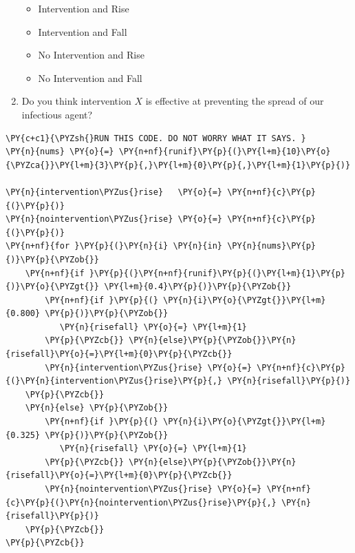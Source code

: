 \begin{enumerate}
  \begin{itemize}
  \tightlist
  \item
    Intervention and Rise
  \item
    Intervention and Fall
  \item
    No Intervention and Rise\\
  \item
    No Intervention and Fall
  \end{itemize}
\item
  Do you think intervention \(X\) is effective at preventing the spread
  of our infectious agent?
\end{enumerate}

    \begin{tcolorbox}[breakable, size=fbox, boxrule=1pt, pad at break*=1mm,colback=cellbackground, colframe=cellborder]
\begin{Verbatim}[commandchars=\\\{\}]
\PY{c+c1}{\PYZsh{}RUN THIS CODE. DO NOT WORRY WHAT IT SAYS. }
\PY{n}{nums} \PY{o}{=} \PY{n+nf}{runif}\PY{p}{(}\PY{l+m}{10}\PY{o}{\PYZca{}}\PY{l+m}{3}\PY{p}{,}\PY{l+m}{0}\PY{p}{,}\PY{l+m}{1}\PY{p}{)}

\PY{n}{intervention\PYZus{}rise}   \PY{o}{=} \PY{n+nf}{c}\PY{p}{(}\PY{p}{)}
\PY{n}{nointervention\PYZus{}rise} \PY{o}{=} \PY{n+nf}{c}\PY{p}{(}\PY{p}{)}
\PY{n+nf}{for }\PY{p}{(}\PY{n}{i} \PY{n}{in} \PY{n}{nums}\PY{p}{)}\PY{p}{\PYZob{}}
    \PY{n+nf}{if }\PY{p}{(}\PY{n+nf}{runif}\PY{p}{(}\PY{l+m}{1}\PY{p}{)}\PY{o}{\PYZgt{}} \PY{l+m}{0.4}\PY{p}{)}\PY{p}{\PYZob{}}
        \PY{n+nf}{if }\PY{p}{(} \PY{n}{i}\PY{o}{\PYZgt{}}\PY{l+m}{0.800} \PY{p}{)}\PY{p}{\PYZob{}}
           \PY{n}{risefall} \PY{o}{=} \PY{l+m}{1}   
        \PY{p}{\PYZcb{}} \PY{n}{else}\PY{p}{\PYZob{}}\PY{n}{risefall}\PY{o}{=}\PY{l+m}{0}\PY{p}{\PYZcb{}}
        \PY{n}{intervention\PYZus{}rise} \PY{o}{=} \PY{n+nf}{c}\PY{p}{(}\PY{n}{intervention\PYZus{}rise}\PY{p}{,} \PY{n}{risefall}\PY{p}{)}
    \PY{p}{\PYZcb{}}
    \PY{n}{else} \PY{p}{\PYZob{}}
        \PY{n+nf}{if }\PY{p}{(} \PY{n}{i}\PY{o}{\PYZgt{}}\PY{l+m}{0.325} \PY{p}{)}\PY{p}{\PYZob{}}
           \PY{n}{risefall} \PY{o}{=} \PY{l+m}{1}   
        \PY{p}{\PYZcb{}} \PY{n}{else}\PY{p}{\PYZob{}}\PY{n}{risefall}\PY{o}{=}\PY{l+m}{0}\PY{p}{\PYZcb{}}
        \PY{n}{nointervention\PYZus{}rise} \PY{o}{=} \PY{n+nf}{c}\PY{p}{(}\PY{n}{nointervention\PYZus{}rise}\PY{p}{,} \PY{n}{risefall}\PY{p}{)}
    \PY{p}{\PYZcb{}}
\PY{p}{\PYZcb{}}
\end{Verbatim}
\end{tcolorbox}
